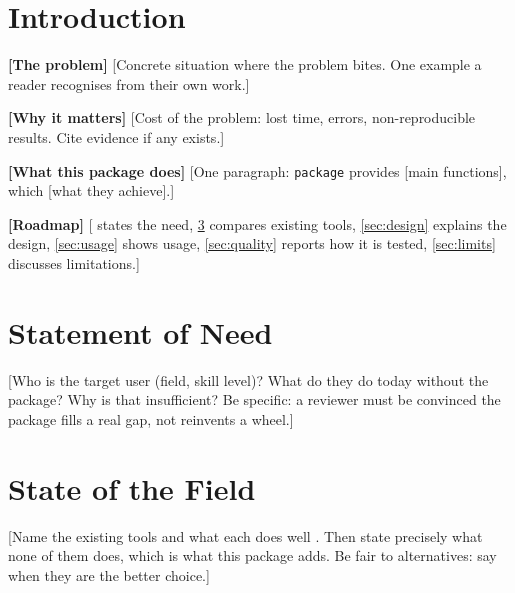 
\begin{abstract}
[1 sentence: the problem, in the user's words, not the package's]
[1 sentence: who has this problem (researchers in X, analysts doing Y)]
[1-2 sentences: what \texttt{{{package}}} does, and how it differs from existing tools]
[1 sentence: key design idea (e.g.\ one call, convention over configuration, no dependencies)]
[1 sentence: availability: open source, license, where to get it]

\medskip
\noindent\textbf{Keywords:} R, [domain], [Keyword 3], [Keyword 4], reproducibility
\end{abstract}

\newpage

\section{Introduction}\label{sec:intro} %

\textbf{[The problem]}
[Concrete situation where the problem bites. One example a reader recognises from their own work.]

\textbf{[Why it matters]}
[Cost of the problem: lost time, errors, non-reproducible results. Cite evidence if any exists.]

\textbf{[What this package does]}
[One paragraph: \texttt{{{package}}} provides [main functions], which [what they achieve].]

\textbf{[Roadmap]}
[ states the need, \cref{sec:field} compares existing tools, \cref{sec:design} explains the design, \cref{sec:usage} shows usage, \cref{sec:quality} reports how it is tested, \cref{sec:limits} discusses limitations.]

\section{Statement of Need}\label{sec:need} %
[Who is the target user (field, skill level)? What do they do today without the package? Why is that insufficient? Be specific: a reviewer must be convinced the package fills a real gap, not reinvents a wheel.]

\section{State of the Field}\label{sec:field} %
[Name the existing tools and what each does well \citep{author2020}. Then state precisely what none of them does, which is what this package adds. Be fair to alternatives: say when they are the better choice.]

